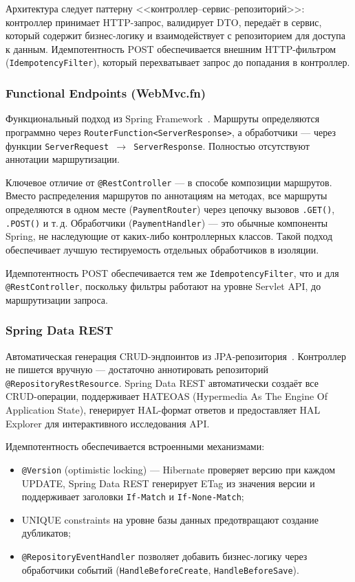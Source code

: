Архитектура следует паттерну <<контроллер--сервис--репозиторий>>: контроллер принимает HTTP-запрос, валидирует DTO, передаёт в сервис, который содержит бизнес-логику и взаимодействует с репозиторием для доступа к данным. Идемпотентность POST обеспечивается внешним HTTP-фильтром (\texttt{IdempotencyFilter}), который перехватывает запрос до попадания в контроллер.

\subsubsection{Functional Endpoints (WebMvc.fn)}

Функциональный подход из Spring Framework~\cite{spring-functional-endpoints}. Маршруты определяются программно через \texttt{RouterFunction<ServerResponse>}, а обработчики --- через функции \texttt{ServerRequest $\to$ ServerResponse}. Полностью отсутствуют аннотации маршрутизации.

Ключевое отличие от \texttt{@RestController} --- в способе композиции маршрутов. Вместо распределения маршрутов по аннотациям на методах, все маршруты определяются в одном месте (\texttt{PaymentRouter}) через цепочку вызовов \texttt{.GET()}, \texttt{.POST()} и т.\,д. Обработчики (\texttt{PaymentHandler}) --- это обычные компоненты Spring, не наследующие от каких-либо контроллерных классов. Такой подход обеспечивает лучшую тестируемость отдельных обработчиков в изоляции.

Идемпотентность POST обеспечивается тем же \texttt{IdempotencyFilter}, что и для \texttt{@RestController}, поскольку фильтры работают на уровне Servlet API, до маршрутизации запроса.

\subsubsection{Spring Data REST}

Автоматическая генерация CRUD-эндпоинтов из JPA-репозитория~\cite{spring-data-rest-guide}. Контроллер не пишется вручную --- достаточно аннотировать репозиторий \texttt{@RepositoryRestResource}. Spring Data REST автоматически создаёт все CRUD-операции, поддерживает HATEOAS (Hypermedia As The Engine Of Application State), генерирует HAL-формат ответов и предоставляет HAL Explorer для интерактивного исследования API.

Идемпотентность обеспечивается встроенными механизмами:
\begin{itemize}
    \item \texttt{@Version} (optimistic locking) --- Hibernate проверяет версию при каждом UPDATE, Spring Data REST генерирует ETag из значения версии и поддерживает заголовки \texttt{If-Match} и \texttt{If-None-Match};
    \item UNIQUE constraints на уровне базы данных предотвращают создание дубликатов;
    \item \texttt{@RepositoryEventHandler} позволяет добавить бизнес-логику через обработчики событий (\texttt{HandleBeforeCreate}, \texttt{HandleBeforeSave}).
\end{itemize}

